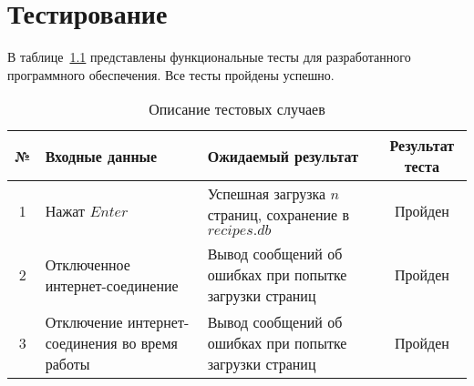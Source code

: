 \chapter{Тестирование}

В таблице~\ref{tbl:tests} представлены функциональные тесты для разработанного
программного обеспечения. Все тесты пройдены успешно.

\begin{table}[h!]
    \begin{center}
		\begin{threeparttable}
    \caption{Описание тестовых случаев}
    \captionsetup{justification=raggedright, singlelinecheck=false}
    \label{tbl:tests}
    \begin{tabular}{|c|p{5cm}|p{7cm}|c|}
        \hline
        \textbf{№} & \textbf{Входные данные} & \textbf{Ожидаемый результат} & \textbf{Результат теста} \\
        \hline
        1 & Нажат $Enter$ & Успешная загрузка $n$ страниц, сохранение в $recipes.db$ & Пройден \\
        \hline
        2 & Отключенное интернет-соединение & Вывод сообщений об ошибках при попытке загрузки страниц & Пройден \\
        \hline
        3 & Отключение интернет-соединения во время работы & Вывод сообщений об ошибках при попытке загрузки страниц & Пройден \\
        \hline
    \end{tabular}
    \end{threeparttable}
    \end{center}
\end{table}

\clearpage